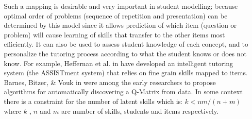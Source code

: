 Such a mapping is desirable and very important in student modelling; because optimal order of problems (sequence of repetition and presentation) can be determined by this model since it allows prediction of which item (question or problem) will cause learning of skills that transfer to the other items most efficiently. It can also be used to assess student knowledge of each concept, and to personalize the tutoring process according to what the student knows or does not know.  For example, Heffernan et al. in \citep{feng2009using} have developed an intelligent tutoring system (the ASSISTment system) that relies on fine grain skills mapped to items.  Barnes, Bitzer, \& Vouk in \citep{barnes2005experimental} were among the early researchers to propose algorithms for automatically discovering a Q-Matrix from data. In some context there is a constraint for the number of latent skills which is: $k<nm/(n+m)$ \protect\citep{lee1999learning} where $k$ , $n$ and $m$ are number of skills, students and items respectively.
  

